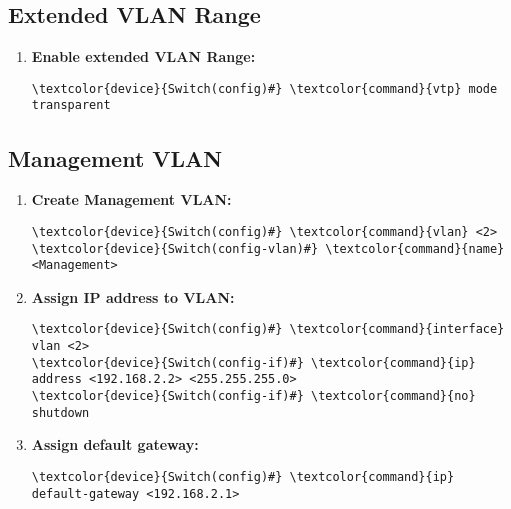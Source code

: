 \documentclass[10pt, a4paper, onecolumn, oneside, titlepage, openany]{book}
\begin{document}
\subsection{Extended VLAN Range}
\begin{enumerate}
    \item \textbf{Enable extended VLAN Range:}
\begin{Verbatim}[commandchars=\\\{\}]
\textcolor{device}{Switch(config)#} \textcolor{command}{vtp} mode transparent
\end{Verbatim}
\end{enumerate}
\subsection{Management VLAN}
\label{management_vlan}
\begin{enumerate}
    \item \textbf{Create Management VLAN:}
\begin{Verbatim}[commandchars=\\\{\}]
\textcolor{device}{Switch(config)#} \textcolor{command}{vlan} <2>
\textcolor{device}{Switch(config-vlan)#} \textcolor{command}{name} <Management>
\end{Verbatim}
    \item \textbf{Assign IP address to VLAN:}
\begin{Verbatim}[commandchars=\\\{\}]
\textcolor{device}{Switch(config)#} \textcolor{command}{interface} vlan <2>
\textcolor{device}{Switch(config-if)#} \textcolor{command}{ip} address <192.168.2.2> <255.255.255.0>
\textcolor{device}{Switch(config-if)#} \textcolor{command}{no} shutdown
\end{Verbatim}
    \item \textbf{Assign default gateway:}
\begin{Verbatim}[commandchars=\\\{\}]
\textcolor{device}{Switch(config)#} \textcolor{command}{ip} default-gateway <192.168.2.1>
\end{Verbatim}
\end{enumerate}
\end{document}
